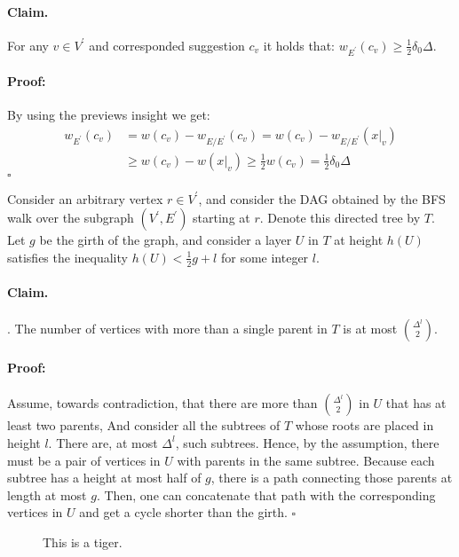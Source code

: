 \documentclass{article}
\begin{document}
\begin{multicols*}{2}
\paragraph{Claim.} For any $v \in V^\prime$ and corresponded suggestion $c_{v}$ it holds that: $w_{E^\prime}\left( c_{v} \right) \ge \frac{1}{2}\delta_{0}\Delta$. 
\paragraph{Proof:}By using the previews insight we get: \begin{equation*}
  \begin{split}
    w_{E^\prime}\left( c_{v} \right) &= w\left( c_{v} \right) - w_{E / E^\prime}\left( c_{v} \right) =  w\left( c_{v} \right) - w_{E / E^\prime}\left( x|_{v} \right) \\ 
     & \ge  w\left( c_{v} \right) - w\left( x|_{v} \right) \ge \frac{1}{2}w\left( c_{v} \right) = \frac{1}{2}\delta_{0}\Delta 
  \end{split}
\end{equation*}
$\square$

Consider an arbitrary vertex $r \in V^\prime$, and consider the DAG obtained by the BFS walk over the subgraph $\left(V^\prime, E^\prime \right)$ starting at $r$. Denote this directed tree by $T$.
Let $g$ be the girth of the graph, and consider a layer $U$ in $T$ at height $h\left( U \right)$ satisfies the inequality $ h\left( U \right) < \frac{1}{2}g + l$ for some integer $l$.
\paragraph{Claim.}. The number of vertices with more than a single parent in $T$ is at most ${\Delta^l}\choose{2}$.  
\paragraph{Proof:}Assume, towards contradiction, that there are more than $ \Delta^l \choose 2 $ in $U$ that has at least two parents, And consider all the subtrees of $T$ whose roots are placed in height $l$. There are, at most $\Delta^l$, such subtrees. Hence, by the assumption, there must be a pair of vertices in $U$ with parents in the same subtree. Because each subtree has a height at most half of $g$, there is a path connecting those parents at length at most $g$. Then, one can concatenate that path with the corresponding vertices in $U$ and get a cycle shorter than the girth. $\square$
\begin{figure*}[t]

\caption{This is a tiger.}
\end{figure*}

\end{multicols*}
\end{document}
